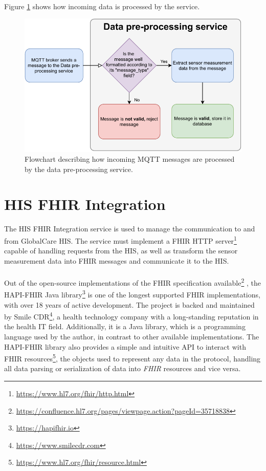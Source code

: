 \paragraph{} Figure \ref{fig:dataprocess_flowdiagram} shows how incoming data is processed by the service. 

\begin{figure}[H]
    \centering
    \includegraphics[width=\linewidth]{images/data pre processing.pdf}
    \caption[Flowchart describing how incoming \acs{MQTT} messages are processed by the data pre-processing service.]{Flowchart describing how incoming \acs{MQTT} messages are processed by the data pre-processing service.}
    \label{fig:dataprocess_flowdiagram}
\end{figure}

\section{\acs{HIS} \acs{FHIR} Integration}
The \acs{HIS} \acs{FHIR} Integration service is used to manage the communication to and from GlobalCare \acs{HIS}. The service must implement a \acs{FHIR} \acs{HTTP} server\footnote{\url{https://www.hl7.org/fhir/http.html}} capable of handling requests from the \acs{HIS}, as well as transform the sensor measurement data into \acs{FHIR} messages and communicate it to the \acs{HIS}.

\paragraph{} Out of the open-source implementations of the \acs{FHIR} specification available\footnote{\url{https://confluence.hl7.org/pages/viewpage.action?pageId=35718838}}
, the HAPI-FHIR Java library\footnote{\url{https://hapifhir.io}} is one of the longest supported \acs{FHIR} implementations, with over 18 years of active development. The project is backed and maintained by Smile CDR\footnote{\url{https://www.smilecdr.com}}, a health technology company with a long-standing reputation in the health \acs{IT} field. Additionally, it is a Java library, which is a programming language used by the author, in contrast to other available implementations. The HAPI-FHIR library also provides a simple and intuitive \acs{API} to interact with \acs{FHIR} resources\footnote{\url{https://www.hl7.org/fhir/resource.html}}, the objects used to represent any data in the protocol, handling all data parsing or serialization of data into \textit{FHIR} resources and vice versa.

